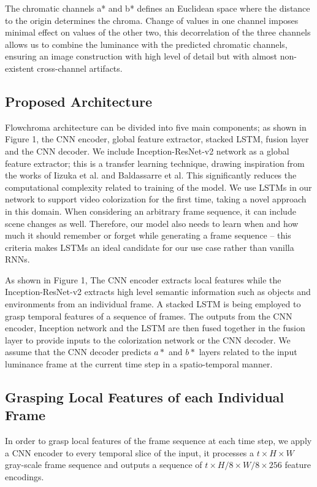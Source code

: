 \documentclass[10pt,twocolumn,letterpaper]{article}
\begin{document}
The chromatic channels a* and b* defines an Euclidean space where the distance to the origin determines the chroma. Change of values in one channel imposes minimal effect on values of the other two, this decorrelation of the three channels allows us to combine the luminance with the predicted chromatic channels, ensuring an image construction with high level of detail but with almost non-existent cross-channel artifacts.

\subsection{Proposed Architecture}

Flowchroma architecture can be divided into five main components; as shown in Figure 1, the CNN encoder, global feature extractor, stacked LSTM, fusion layer and the CNN decoder. We include Inception-ResNet-v2 network as a global feature extractor; this is a transfer learning technique, drawing inspiration from the works of Iizuka et al. and Baldassarre et al. This significantly reduces the computational complexity related to training of the model. We use LSTMs in our network to support video colorization for the first time, taking a novel approach in this domain. When considering an arbitrary frame sequence, it can include scene changes as well. Therefore, our model also needs to learn when and how much it should remember or forget while generating a frame sequence -- this criteria makes LSTMs an ideal candidate for our use case rather than vanilla RNNs.

As shown in Figure 1, The CNN encoder extracts local features while the Inception-ResNet-v2 extracts high level semantic information such as objects and environments from an individual frame. A stacked LSTM is being employed to grasp temporal features of a sequence of frames. The outputs from the CNN encoder, Inception network and the LSTM are then fused together in the fusion layer to provide inputs to the colorization network or the CNN decoder. We assume that the CNN decoder predicts $a*$ and $b*$ layers related to the input luminance frame at the current time step in a spatio-temporal manner.

\subsection{Grasping Local Features of each Individual Frame}
In order to grasp local features of the frame sequence at each time step, we apply a CNN encoder to every temporal slice of the input, it processes a $t\times H\times W$ gray-scale frame sequence and outputs a sequence of $t\times H/8\times W/8\times 256$ feature encodings.
\end{document}
